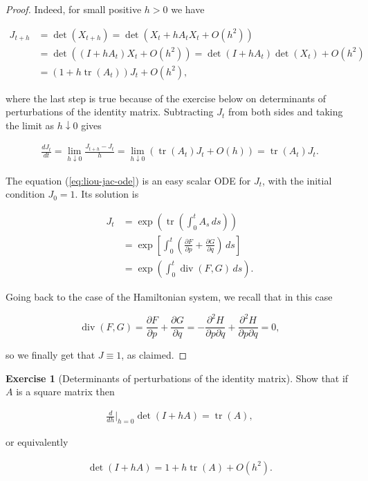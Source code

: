 \documentclass[11pt]{report}
\theoremstyle{plain}
\theoremstyle{definition}
\newtheorem{xexercise}[thm]{Exercise}
\begin{document}
\begin{proof}
Indeed, for small positive $h>0$ we have

\begin{align*}
J_{t+h} &= \det(X_{t+h}) = \det( X_t+h A_t X_t + O(h^2) ) \\
&= \det((I+h A_t)X_t+O(h^2))
= \det(I+h A_t) \det(X_t) + O(h^2) \\
&= (1 + h \operatorname{tr}(A_t)) J_t + O(h^2),
\end{align*}

where the last step is true because of the exercise
below on determinants of perturbations of the identity
matrix. Subtracting $J_t$ from both sides and taking
the limit as $h\downarrow 0$ gives

\begin{align*}
\frac{dJ_t}{dt} = \lim_{h\downarrow 0} \frac{J_{t+h}-J_t}{h} =
\lim_{h\downarrow 0} \left(\operatorname{tr}(A_t)J_t + O(h)\right) = \operatorname{tr}(A_t)J_t.
\end{align*}

The equation (\ref{eq:liou-jac-ode}) is an easy scalar
ODE for $J_t$, with the initial condition $J_0=1$.
Its solution is

\begin{equation*} \tag{19}\label{eq:liouville-jacobian}
\begin{split}
J_t &= \exp\left( \operatorname{tr}\left(\int_0^t A_s\,ds\right)\right) \\
&= \exp\left[ \int_0^t \left(\frac{\partial F}{\partial p}+\frac{\partial G}{\partial q}\right)\,ds \right] \\
&= \exp\left( \int_0^t \operatorname{div}(F,G) \,ds \right).
\end{split}
\end{equation*}

Going back to the case of the Hamiltonian system, we
recall that in this case

\[
\operatorname{div} (F,G) = \frac{\partial F}{\partial p}+\frac{\partial G}{\partial q} = -\frac{\partial^2 H}{\partial p \partial q} +
\frac{\partial^2 H}{\partial p \partial q} = 0,
\]

so we finally get that $J \equiv 1$, as claimed.
\end{proof}

\begin{xexercise}[Determinants of perturbations of the identity matrix]
Show that if $A$ is a square matrix then

\begin{align*}
\frac{d}{dh}\Big|_{h=0} \det(I+h A) = \operatorname{tr}(A),
\end{align*}

or equivalently

\begin{align*}
\det(I+h A) = 1 + h \operatorname{tr}(A) + O(h^2).
\end{align*}

\end{xexercise}
\end{document}
